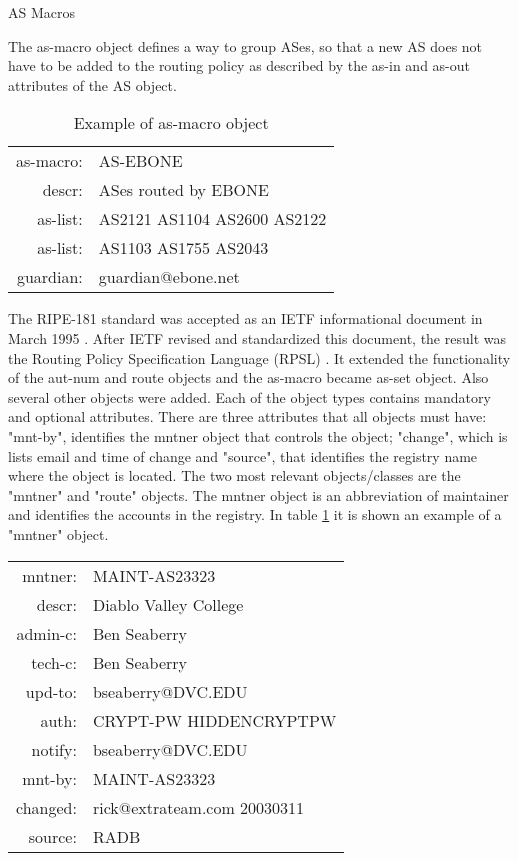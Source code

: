 \documentclass[11pt,a4paper]{scrreprt}
\begin{document}
\begin{appendices}
        
AS Macros          
          
The as-macro object defines a way to group ASes, so that a new AS does not have to be added to the routing policy as described by the as-in and as-out attributes of the AS object.          
          
\begin{table}[!h]
\centering
\begin{tabular}{  r  l  }

as-macro:   	&      AS-EBONE\\
descr:    	&      ASes routed by EBONE\\
as-list:    	&      AS2121 AS1104 AS2600 AS2122\\
as-list:    	&      AS1103 AS1755 AS2043\\
guardian:   	&      guardian@ebone.net\\

\end{tabular}
\caption{Example of as-macro object}
\label{table:5}
\end{table} 

The RIPE-181 standard was accepted as an IETF informational document in March 1995 \cite{RFC_1786}. After IETF revised and standardized this document, the result was the Routing Policy Specification Language (RPSL) \cite{RFC_2622}. It extended the functionality of the aut-num and route objects and the as-macro became as-set object. Also several other objects were added.
Each of the object types contains mandatory and optional attributes. There are three attributes that all objects must have: "mnt-by", identifies the mntner object that controls the object; "change", which is lists email and time of change and "source", that identifies the registry name where the object is located.
The two most relevant objects/classes are the "mntner" and "route" objects. The mntner object is an abbreviation of maintainer and identifies the accounts in the registry.
In table \ref{table:5} it is shown an example of a "mntner" object. 

\begin{table}[!h]
\centering
\begin{tabular}{  r  l  }

mntner:   	&      MAINT-AS23323\\
descr:    	&      Diablo Valley College\\
admin-c:    	&      Ben Seaberry\\
tech-c:    	&      Ben Seaberry\\
upd-to:   	&      bseaberry@DVC.EDU\\
auth:   		&      CRYPT-PW HIDDENCRYPTPW\\
notify:   	&      bseaberry@DVC.EDU\\
mnt-by:   	&      MAINT-AS23323\\
changed:   	&      rick@extrateam.com 20030311\\
source:   	&      RADB\\


\end{tabular}
\end{table}
\end{appendices}
\end{document}
